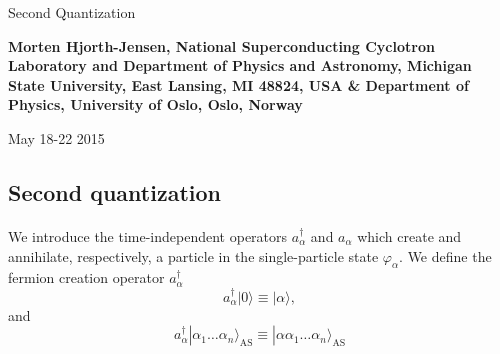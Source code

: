 \documentclass[%
twoside,                 %
final,                   %
10pt]{article}
\begin{document}






\thispagestyle{empty}

\begin{center}
{\LARGE\bf
\begin{spacing}{1.25}
Second Quantization
\end{spacing}
}
\end{center}


\begin{center}
{\bf Morten Hjorth-Jensen, National Superconducting Cyclotron Laboratory and Department of Physics and Astronomy, Michigan State University, East Lansing, MI 48824, USA {\&} Department of Physics, University of Oslo, Oslo, Norway${}^{}$} \\ [0mm]
\end{center}

    \begin{center}
\end{center}
    

\begin{center} %
May 18-22 2015
\end{center}

\vspace{1cm}


\subsection*{Second quantization}

\paragraph{}
We introduce the time-independent  operators
$a_\alpha^{\dagger}$ and $a_\alpha$   which create and annihilate, respectively, a particle 
in the single-particle state 
$\varphi_\alpha$. 
We define the fermion creation operator
$a_\alpha^{\dagger}$ 
\begin{equation}
	a_\alpha^{\dagger}|0\rangle \equiv  |\alpha\rangle  \label{eq:2-1a},
\end{equation}
and
\begin{equation}
	a_\alpha^{\dagger}|\alpha_1\dots \alpha_n\rangle_{\mathrm{AS}} \equiv  |\alpha\alpha_1\dots \alpha_n\rangle_{\mathrm{AS}} \label{eq:2-1b}
\end{equation}
\end{document}
